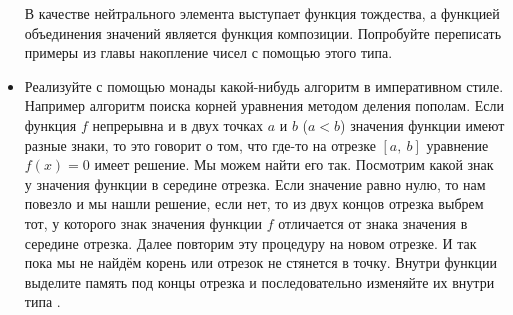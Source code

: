 \begin{itemize}
  В качестве нейтрального элемента выступает функция тождества, а
  функцией объединения значений является функция композиции. Попробуйте
  переписать примеры из главы накопление чисел с помощью этого типа.
\item
  Реализуйте с помощью монады  какой-нибудь алгоритм в
  императивном стиле. Например алгоритм поиска корней уравнения методом
  деления пополам. Если функция $f$ непрерывна и в двух точках $a$ и $b$
  ($a < b$) значения функции имеют разные знаки, то это говорит о том,
  что где-то на отрезке $[a,\ b]$ уравнение $f(x) = 0$ имеет решение. Мы
  можем найти его так. Посмотрим какой знак у значения функции в
  середине отрезка. Если значение равно нулю, то нам повезло и мы нашли
  решение, если нет, то из двух концов отрезка выбрем тот, у которого
  знак значения функции $f$ отличается от знака значения в середине
  отрезка. Далее повторим эту процедуру на новом отрезке. И так пока мы
  не найдём корень или отрезок не стянется в точку. Внутри функции
  выделите память под концы отрезка и последовательно изменяйте их
  внутри типа .
\end{itemize}
